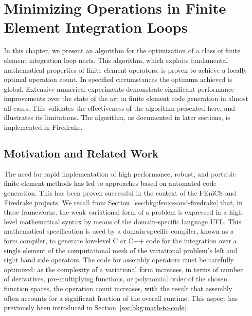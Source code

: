 
\chapter{Minimizing Operations in Finite Element Integration Loops}
\label{ch:optimality}

In this chapter, we present an algorithm for the optimization of a class of finite element integration loop nests. This algorithm, which exploits fundamental mathematical properties of finite element operators, is proven to achieve a locally optimal operation count. In specified circumstances the optimum achieved is global. Extensive numerical experiments demonstrate significant performance improvements over the state of the art in finite element code generation in almost all cases. This validates the effectiveness of the algorithm presented here, and illustrates its limitations. The algorithm, as documented in later sections, is implemented in Firedrake.

\section{Motivation and Related Work}

The need for rapid implementation of high performance, robust, and portable finite element methods has led to approaches based on automated code generation. This has been proven successful in the context of the FEniCS  and Firedrake projects. We recall from Section~\ref{sec:bkg:fenics-and-firedrake} that, in these frameworks, the weak variational form of a problem is expressed in a high level mathematical syntax by means of the domain-specific language UFL. This mathematical specification is used by a domain-specific compiler, known as a form compiler, to generate low-level C or C++ code for the integration over a single element of the computational mesh of the variational problem's left and right hand side operators. The code for assembly operators must be carefully optimized: as the complexity of a variational form increases, in terms of number of derivatives, pre-multiplying functions, or polynomial order of the chosen function spaces, the operation count increases, with the result that assembly often accounts for a significant fraction of the overall runtime. This aspect has previously been introduced in Section~\ref{sec:bkg:math-to-code}.

